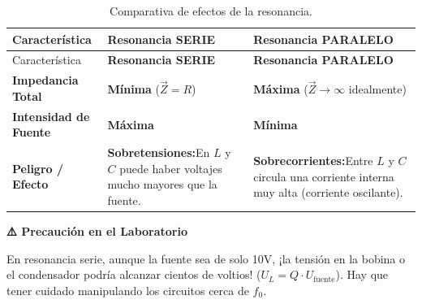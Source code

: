 \documentclass[
  a4paper,
  DIV=11,
  numbers=noendperiod]{scrreprt}
\begin{document}
\begin{longtable}[]{@{}
  >{\raggedright\arraybackslash}p{}
  >{\raggedright\arraybackslash}p{}
  >{\raggedright\arraybackslash}p{}@{}}
\caption{Comparativa de efectos de la
resonancia.}\label{tbl-resonancia-comparativa}\tabularnewline
\toprule\noalign{}
\begin{minipage}[b]{\linewidth}\raggedright
Característica
\end{minipage} & \begin{minipage}[b]{\linewidth}\raggedright
\textbf{Resonancia SERIE}
\end{minipage} & \begin{minipage}[b]{\linewidth}\raggedright
\textbf{Resonancia PARALELO}
\end{minipage} \\
\midrule\noalign{}
\endfirsthead
\toprule\noalign{}
\begin{minipage}[b]{\linewidth}\raggedright
Característica
\end{minipage} & \begin{minipage}[b]{\linewidth}\raggedright
\textbf{Resonancia SERIE}
\end{minipage} & \begin{minipage}[b]{\linewidth}\raggedright
\textbf{Resonancia PARALELO}
\end{minipage} \\
\midrule\noalign{}
\endhead
\bottomrule\noalign{}
\endlastfoot
\textbf{Impedancia Total} & \textbf{Mínima} (\(\vec{Z} = R\)) &
\textbf{Máxima} (\(\vec{Z} \to \infty\) idealmente) \\
\textbf{Intensidad de Fuente} & \textbf{Máxima} & \textbf{Mínima} \\
\textbf{Peligro / Efecto} & \textbf{Sobretensiones:}En \(L\) y \(C\)
puede haber voltajes mucho mayores que la fuente. &
\textbf{Sobrecorrientes:}Entre \(L\) y \(C\) circula una corriente
interna muy alta (corriente oscilante). \\
\end{longtable}

\begin{tcolorbox}[enhanced jigsaw, breakable, colback=white, left=2mm, leftrule=.75mm, rightrule=.15mm, toprule=.15mm, colframe=quarto-callout-tip-color-frame, arc=.35mm, bottomrule=.15mm, opacityback=0]

\vspace{-3mm}\textbf{⚠️ Precaución en el Laboratorio}\vspace{3mm}

En resonancia serie, aunque la fuente sea de solo 10V, ¡la tensión en la
bobina o el condensador podría alcanzar cientos de voltios!
(\(U_L = Q \cdot U_{\text{fuente}}\)). Hay que tener cuidado manipulando
los circuitos cerca de \(f_0\).

\end{tcolorbox}
\end{document}
